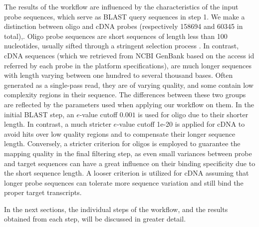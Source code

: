 The results of the workflow are influenced by the characteristics
of the input probe sequences, which serve as BLAST query
sequences in step 1. We make a distinction between oligo and cDNA
probes (respectively 158694 and 60345 in total),. Oligo probe sequences
are short sequences of length less than 100 nucleotides, usually
sifted through a stringent selection process \cite{Leparc2009,Rouillard2003}. 
In contrast, cDNA sequences (which
we retrieved from NCBI GenBank based on the access id referred by
each probe in the platform specifications), are much longer
sequences with length varying between one hundred to several
thousand bases. Often generated as a single-pass read, they are
of varying quality, and some contain low complexity regions in
their sequence. The differences between these two groups are
reflected by the parameters used when applying our workflow on
them. In the initial BLAST step, an $e$-value cutoff $0.001$ is used
for oligo due to their shorter length. In contrast, a much
stricter $e$-value cutoff 1e-20 is applied for cDNA to avoid hits
over low quality regions and to compensate their longer sequence
length. Conversely, a stricter criterion for oligos is employed
to guarantee the mapping quality in the final filtering step, as
even small variances between probe and target sequences can have
a great influence on their binding specificity due to the short
sequence length. A looser criterion is utilized for cDNA assuming
that longer probe sequences can tolerate more sequence variation
and still bind the proper target transcripts.

In the next sections, the individual steps of the workflow, and
the results obtained from each step, will be discussed in greater
detail.

